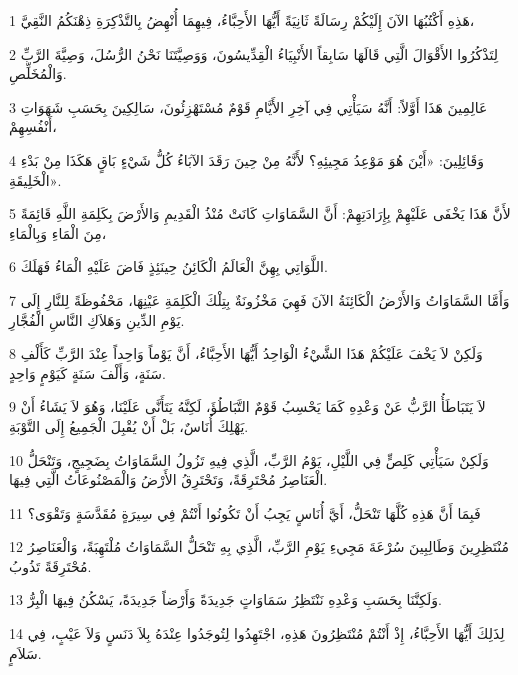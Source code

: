 \par 1 هَذِهِ أَكْتُبُهَا الآنَ إِلَيْكُمْ رِسَالَةً ثَانِيَةً أَيُّهَا الأَحِبَّاءُ، فِيهِمَا أُنْهِضُ بِالتَّذْكِرَةِ ذِهْنَكُمُ النَّقِيَّ،
\par 2 لِتَذْكُرُوا الأَقْوَالَ الَّتِي قَالَهَا سَابِقاً الأَنْبِيَاءُ الْقِدِّيسُونَ، وَوَصِيَّتَنَا نَحْنُ الرُّسُلَ، وَصِيَّةَ الرَّبِّ وَالْمُخَلِّصِ.
\par 3 عَالِمِينَ هَذَا أَوَّلاً: أَنَّهُ سَيَأْتِي فِي آخِرِ الأَيَّامِ قَوْمٌ مُسْتَهْزِئُونَ، سَالِكِينَ بِحَسَبِ شَهَوَاتِ أَنْفُسِهِمْ،
\par 4 وَقَائِلِينَ: «أَيْنَ هُوَ مَوْعِدُ مَجِيئِهِ؟ لأَنَّهُ مِنْ حِينَ رَقَدَ الآبَاءُ كُلُّ شَيْءٍ بَاقٍ هَكَذَا مِنْ بَدْءِ الْخَلِيقَةِ».
\par 5 لأَنَّ هَذَا يَخْفَى عَلَيْهِمْ بِإِرَادَتِهِمْ: أَنَّ السَّمَاوَاتِ كَانَتْ مُنْذُ الْقَدِيمِ وَالأَرْضَ بِكَلِمَةِ اللَّهِ قَائِمَةً مِنَ الْمَاءِ وَبِالْمَاءِ،
\par 6 اللَّوَاتِي بِهِنَّ الْعَالَمُ الْكَائِنُ حِينَئِذٍ فَاضَ عَلَيْهِ الْمَاءُ فَهَلَكَ.
\par 7 وَأَمَّا السَّمَاوَاتُ وَالأَرْضُ الْكَائِنَةُ الآنَ فَهِيَ مَخْزُونَةٌ بِتِلْكَ الْكَلِمَةِ عَيْنِهَا، مَحْفُوظَةً لِلنَّارِ إِلَى يَوْمِ الدِّينِ وَهَلاَكِ النَّاسِ الْفُجَّارِ.
\par 8 وَلَكِنْ لاَ يَخْفَ عَلَيْكُمْ هَذَا الشَّيْءُ الْوَاحِدُ أَيُّهَا الأَحِبَّاءُ، أَنَّ يَوْماً وَاحِداً عِنْدَ الرَّبِّ كَأَلْفِ سَنَةٍ، وَأَلْفَ سَنَةٍ كَيَوْمٍ وَاحِدٍ.
\par 9 لاَ يَتَبَاطَأُ الرَّبُّ عَنْ وَعْدِهِ كَمَا يَحْسِبُ قَوْمٌ التَّبَاطُؤَ، لَكِنَّهُ يَتَأَنَّى عَلَيْنَا، وَهُوَ لاَ يَشَاءُ أَنْ يَهْلِكَ أُنَاسٌ، بَلْ أَنْ يُقْبِلَ الْجَمِيعُ إِلَى التَّوْبَةِ.
\par 10 وَلَكِنْ سَيَأْتِي كَلِصٍّ فِي اللَّيْلِ، يَوْمُ الرَّبِّ، الَّذِي فِيهِ تَزُولُ السَّمَاوَاتُ بِضَجِيجٍ، وَتَنْحَلُّ الْعَنَاصِرُ مُحْتَرِقَةً، وَتَحْتَرِقُ الأَرْضُ وَالْمَصْنُوعَاتُ الَّتِي فِيهَا.
\par 11 فَبِمَا أَنَّ هَذِهِ كُلَّهَا تَنْحَلُّ، أَيَّ أُنَاسٍ يَجِبُ أَنْ تَكُونُوا أَنْتُمْ فِي سِيرَةٍ مُقَدَّسَةٍ وَتَقْوَى؟
\par 12 مُنْتَظِرِينَ وَطَالِبِينَ سُرْعَةَ مَجِيءِ يَوْمِ الرَّبِّ، الَّذِي بِهِ تَنْحَلُّ السَّمَاوَاتُ مُلْتَهِبَةً، وَالْعَنَاصِرُ مُحْتَرِقَةً تَذُوبُ.
\par 13 وَلَكِنَّنَا بِحَسَبِ وَعْدِهِ نَنْتَظِرُ سَمَاوَاتٍ جَدِيدَةً وَأَرْضاً جَدِيدَةً، يَسْكُنُ فِيهَا الْبِرُّ.
\par 14 لِذَلِكَ أَيُّهَا الأَحِبَّاءُ، إِذْ أَنْتُمْ مُنْتَظِرُونَ هَذِهِ، اجْتَهِدُوا لِتُوجَدُوا عِنْدَهُ بِلاَ دَنَسٍ وَلاَ عَيْبٍ، فِي سَلاَمٍ.
